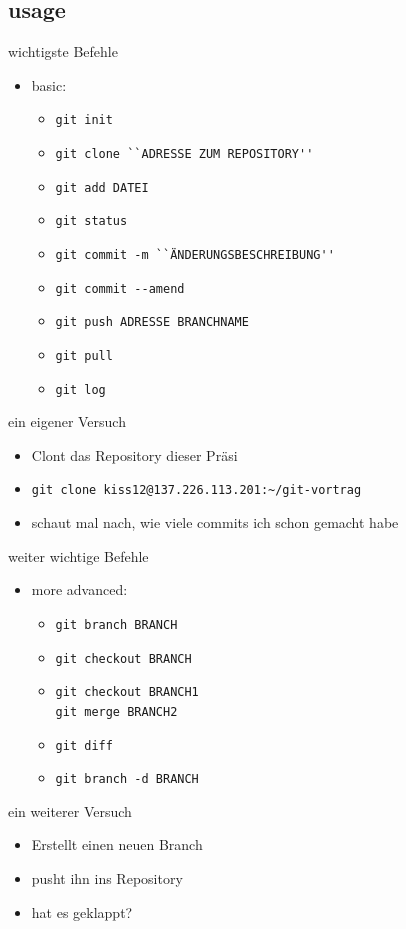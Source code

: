 \documentclass{beamer}
\begin{document}
\subsection{usage}
\begin{frame}[fragile]{wichtigste Befehle}
	\begin{itemize}
		\item basic:
			\begin{itemize}
				\item \verb+git init+
				\item \verb+git clone ``ADRESSE ZUM REPOSITORY''+
				\item \verb+git add DATEI+
				\item \verb+git status+
				\item \verb+git commit -m ``ÄNDERUNGSBESCHREIBUNG''+
				\item \verb+git commit --amend+
				\item \verb+git push ADRESSE BRANCHNAME+
				\item \verb+git pull+
				\item \verb+git log+
			\end{itemize}
	\end{itemize}
	\begin{block}{ein eigener Versuch}
		\begin{itemize}
			\item Clont das Repository dieser Präsi
			\item \verb|git clone kiss12@137.226.113.201:~/git-vortrag|
			\item schaut mal nach, wie viele commits ich schon gemacht habe
		\end{itemize}
	\end{block}
\end{frame}

\begin{frame}[fragile]{weiter wichtige Befehle}
	\begin{itemize}
		\item more advanced:
			\begin{itemize}
				\item \verb+git branch BRANCH+
				\item \verb+git checkout BRANCH+
				\item \verb+git checkout BRANCH1+\\
					\verb+git merge BRANCH2+
				\item \verb+git diff+
				\item \verb+git branch -d BRANCH+
			\end{itemize}
	\end{itemize}
	\begin{block}{ein weiterer Versuch}
		\begin{itemize}
			\item Erstellt einen neuen Branch
			\item pusht ihn ins Repository
			\item hat es geklappt?
		\end{itemize}
	\end{block}
\end{frame}
\end{document}

